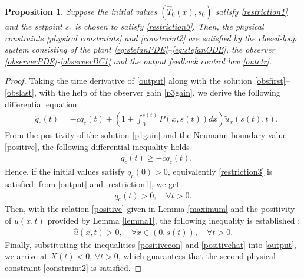 \documentclass[journal]{IEEEtran}
\newtheorem{prop}{Proposition}
\begin{document}
\begin{prop}\label{proposition}
Suppose the initial values $(\hat{T}_0(x), s_0)$ satisfy \eqref{restriction1} and the setpoint $s_{{\mathrm r}}$ is chosen to satisfy \eqref{restriction3}. 
Then, the physical constraints \eqref{physical constraints} and \eqref{constraint2} are satisfied by  the closed-loop system consisting of the plant   \eqref{eq:stefanPDE}--\eqref{eq:stefanODE}, the observer \eqref{observerPDE}-\eqref{observerBC1} and the output feedback control law \eqref{outctr}.
\end{prop}
\begin{proof}
Taking the time derivative of \eqref{output} along with the solution \eqref{obsfirst}--\eqref{obslast}, with the help of the observer gain \eqref{p3gain},  we derive the following differential equation:
\begin{align}\label{odecontrol}  
&\dot{q}_c(t)=-cq_{{\mathrm c}}(t)+\left( 1+ \int_0^{s(t)} P(x,s(t)) dx \right)\tilde{u}_x(s(t),t).
\end{align}
From the positivity of the solution \eqref{p1gain} and the Neumann boundary value \eqref{positive},  the following differential inequality holds
\begin{align}
&\dot{q}_c(t)\geq -cq_{{\mathrm c}}(t).
\end{align}
Hence, if the initial values satisfy $q_{{\mathrm c}}(0)>0$, equivalently \eqref{restriction3} is satisfied, from     \eqref{output} and \eqref{restriction1}, we get
\begin{align}\label{positivecon}
 q_{{\mathrm c}}(t)>0, \quad \forall t>0. 
 \end{align}
Then, with the relation \eqref{positive} given in Lemma \ref{maximum} and the positivity of $u(x,t)$ provided by Lemma \ref{lemma1}, the following inequality is established :
\begin{align}\label{positivehat}
\hat{u}(x,t) >0, \quad \forall x \in(0,s(t)), \quad  \forall t>0.
\end{align}
Finally, substituting the inequalities \eqref{positivecon} and \eqref{positivehat} into \eqref{output}, we arrive at $X(t) <0$, $\forall t>0$, which guarantees that the second physical constraint \eqref{constraint2} is satisfied. 
\end{proof} 
\end{document}
